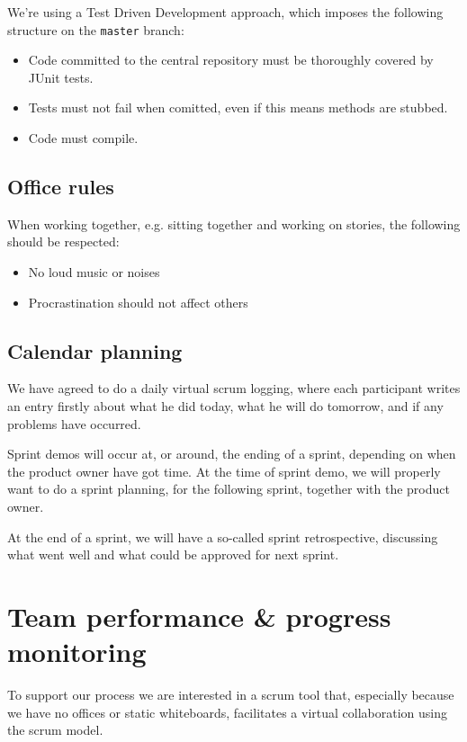 \documentclass[a4paper,11pt]{article}
\begin{document}
We're using a Test Driven Development approach, which imposes the following structure on the \texttt{master} branch:
\begin{itemize}
\item Code committed to the central repository must be thoroughly covered by JUnit tests.
\item Tests must not fail when comitted, even if this means methods are stubbed.
\item Code must compile.
\end{itemize}


\subsection{Office rules} %
\label{subsec:office_rules}
When working together, e.g. sitting together and working on stories, the following should be respected:

\begin{itemize}
	\item No loud music or noises

	\item Procrastination should not affect others
\end{itemize}

\subsection{Calendar planning} %
\label{subsec:calendar_planning}

We have agreed to do a daily virtual scrum logging, where each participant writes an entry firstly about what he did today, what he will do tomorrow, and if any problems have occurred.

Sprint demos will occur at, or around, the ending of a sprint, depending on when the product owner have got time.
At the time of sprint demo, we will properly want to do a sprint planning, for the following sprint, together with the product owner.

At the end of a sprint, we will have a so-called sprint retrospective, discussing what went well and what could be approved for next sprint.



\section{Team performance \& progress monitoring} %
\label{sec:team_performance_progress_monitoring}
To support our process we are interested in a scrum tool that, especially because we have no offices or static whiteboards, facilitates a virtual collaboration using the scrum model.
\end{document}
